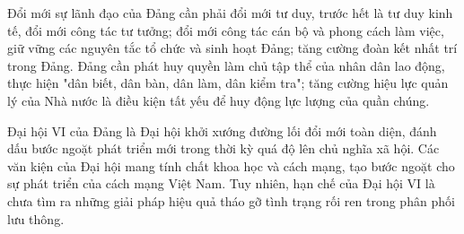 Đổi mới sự lãnh đạo của Đảng cần phải đổi mới tư duy, trước hết là tư duy kinh tế, đổi mới công tác tư tưởng; đổi mới công tác cán bộ và phong cách làm việc, giữ vững các nguyên tắc tổ chức và sinh hoạt Đảng; tăng cường đoàn kết nhất trí trong Đảng. Đảng cần phát huy quyền làm chủ tập thể của nhân dân lao động, thực hiện "dân biết, dân bàn, dân làm, dân kiểm tra"; tăng cường hiệu lực quản lý của Nhà nước là điều kiện tất yếu để huy động lực lượng của quần chúng.

Đại hội VI của Đảng là Đại hội khởi xướng đường lối đổi mới toàn diện, đánh dấu bước ngoặt phát triển mới trong thời kỳ quá độ lên chủ nghĩa xã hội. Các văn kiện của Đại hội mang tính chất khoa học và cách mạng, tạo bước ngoặt cho sự phát triển của cách mạng Việt Nam. Tuy nhiên, hạn chế của Đại hội VI là chưa tìm ra những giải pháp hiệu quả tháo gỡ tình trạng rối ren trong phân phối lưu thông.